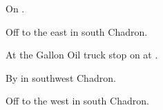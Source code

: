 
\begin{LocationList}

On  .

Off  to the east in south Chadron.

At the Gallon Oil truck stop on  at .

By   in southwest Chadron.

\Location{\TruckService \Service}
Off  to the west in south Chadron.

\end{LocationList}
